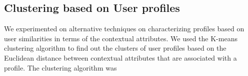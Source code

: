 \documentclass{article}
\begin{document}

\subsection{Clustering based on User profiles}
 We experimented on alternative techniques on characterizing profiles based on user similarities in terms of the contextual attributes. We used the K-means clustering algorithm to find out the clusters of user profiles based on the Euclidean distance between contextual attributes that are associated with a profile. The clustering algorithm was 
\end{document}
